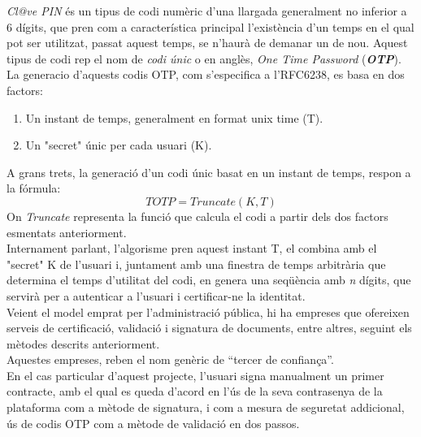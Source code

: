 \newline \textit{Cl@ve PIN} és un tipus de codi numèric d'una llargada generalment no inferior a 6 dígits, que pren com a característica principal l'existència d'un temps en el qual pot ser utilitzat, passat aquest temps, se n'haurà de demanar un de nou. Aquest tipus de codi rep el nom de \textit{codi únic} o en anglès, \textit{One Time Password}\cite{otp} (\textbf{\textit{OTP}}).\\
\newline La generacio d'aquests codis OTP, com s'especifica a l'RFC6238, es basa en dos factors:
\begin{enumerate}
    \item Un instant de temps, generalment en format unix time (T).
    \item Un "secret" únic per cada usuari (K).
\end{enumerate}
A grans trets, la generació d'un codi únic basat en un instant de temps, respon a la fórmula: 
\[TOTP = Truncate(K, T)\]
On \textit{Truncate} representa la funció que calcula el codi a partir dels dos factors esmentats anteriorment.\\
Internament parlant, l'algorisme pren aquest instant T, el combina amb el "secret" K de l'usuari i, juntament amb una finestra de temps arbitrària que determina el temps d'utilitat del codi, en genera una seqüència amb \textit{n} dígits, que servirà per a autenticar a l'usuari i certificar-ne la identitat.\\
\newline Veient el model emprat per l'administració pública, hi ha empreses que ofereixen serveis de certificació, validació i signatura de documents, entre altres, seguint els mètodes descrits anteriorment.\\
\newline Aquestes empreses, reben el nom genèric de ``tercer de confiança''.\\
\newline En el cas particular d'aquest projecte, l'usuari signa manualment un primer contracte, amb el qual es queda d'acord en l'ús de la seva contrasenya de la plataforma com a mètode de signatura, i com a mesura de seguretat addicional, ús de codis OTP com a mètode de validació en dos passos.